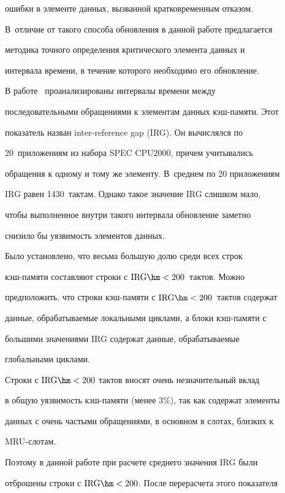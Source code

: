 ошибки в элементе данных, вызванной кратковременным отказом. 

В~отличие от такого способа обновления в данной работе предлагается 

методика точного определения критического элемента данных и 

интервала времени, в течение которого необходимо его обновление.

    

    В работе~\cite{3ss} проанализированы интервалы времени между 

последовательными обращениями к элементам данных кэш-памяти. Этот 

показатель назван inter-reference gap (IRG). Он вычислялся по 

20~приложениям из набора SPEC CPU2000, причем учитывались 

обращения к одному и тому же элементу. В~среднем по 20 приложениям 

IRG равен 1430~тактам. Однако такое значение IRG слишком мало, 

чтобы выполненное внутри такого интервала обновление заметно 

снизило бы уязвимость элементов данных.

    

    Было установлено, что весьма большую долю среди всех строк 

    кэш-памяти составляют строки с $\mathrm{IRG}\hm< 200$~тактов. Можно 

предположить, что строки кэш-памяти с $\mathrm{IRG}\hm< 200$~тактов содержат 

данные, обрабатываемые локальными циклами, а блоки кэш-памяти с 

большими значениями IRG содержат данные, обрабатываемые 

глобальными циклами. 

    

    Строки с $\mathrm{IRG}\hm< 200$ тактов вносят очень незначительный вклад 

в общую уязвимость кэш-памяти (менее 3\%), так как содержат элементы 

данных с очень частыми обращениями, в основном в слотах, близких к 

MRU-сло\-там.


    Поэтому в данной работе при расчете среднего значения IRG были 

отброшены строки с $\mathrm{IRG}\hm<200$. После перерасчета этого показателя 


